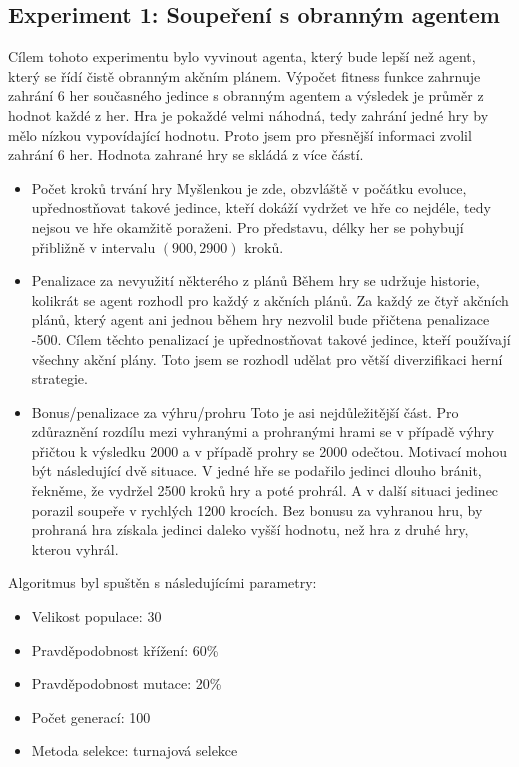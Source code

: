 \subsection{Experiment 1: Soupeření s obranným agentem}
Cílem tohoto experimentu bylo vyvinout agenta, který bude lepší než agent, který se řídí čistě obranným akčním plánem.
Výpočet fitness funkce zahrnuje zahrání 6 her současného jedince s obranným agentem a výsledek je průměr z hodnot každé z her.
Hra je pokaždé velmi náhodná, tedy zahrání jedné hry by mělo nízkou vypovídající hodnotu. Proto jsem pro přesnější informaci zvolil zahrání 6 her.
Hodnota zahrané hry se skládá z více částí.
\begin{itemize}
    \item Počet kroků trvání hry
        \newline
        Myšlenkou je zde, obzvláště v počátku evoluce, upřednostňovat takové jedince, kteří dokáží vydržet ve hře co nejdéle, tedy nejsou ve hře okamžitě poraženi.
        Pro představu, délky her se pohybují přibližně v intervalu $(900,2900)$ kroků.
    \item Penalizace za nevyužití některého z plánů
        \newline
        Během hry se udržuje historie, kolikrát se agent rozhodl pro každý z akčních plánů.
        Za každý ze čtyř akčních plánů, který agent ani jednou během hry nezvolil bude přičtena penalizace -500. Cílem těchto penalizací je upřednostňovat takové jedince, kteří používají všechny akční plány. 
        Toto jsem se rozhodl udělat pro větší diverzifikaci herní strategie.
    \item Bonus/penalizace za výhru/prohru
        \newline
        Toto je asi nejdůležitější část. Pro zdůraznění rozdílu mezi vyhranými a prohranými hrami se v případě výhry přičtou k výsledku 2000 a v případě prohry se 2000 odečtou.
        Motivací mohou být následující dvě situace. V jedné hře se podařilo jedinci dlouho bránit, řekněme, že vydržel 2500 kroků hry a poté prohrál. A v další situaci jedinec porazil soupeře v rychlých 1200 krocích. 
        Bez bonusu za vyhranou hru, by prohraná hra získala jedinci daleko vyšší hodnotu, než hra z druhé hry, kterou vyhrál.        
    
\end{itemize}

Algoritmus byl spuštěn s následujícími parametry:
\begin{itemize}
    \item Velikost populace: 30
    \item Pravděpodobnost křížení: 60\%
    \item Pravděpodobnost mutace: 20\%
    \item Počet generací: 100
    \item Metoda selekce: turnajová selekce
\end{itemize}

